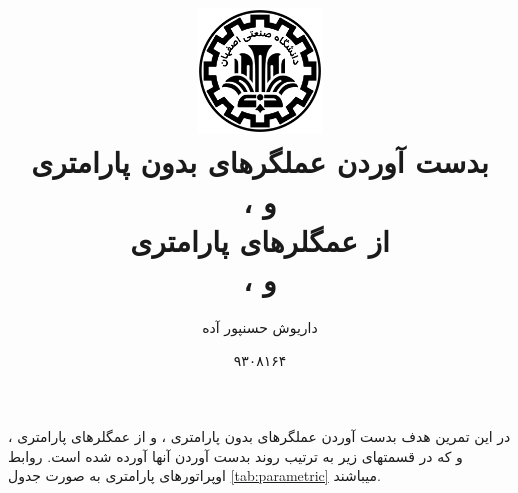 \documentclass[10pt,a4paper]{article}
\newcommand{\نیمفاصله}{\halfspace}
\renewcommand{\ }{\halfspace}
\begin{document}
\title{
    \includegraphics[width=0.25\textwidth]{iut}\\\vspace{30pt}
    بدست آوردن عملگرهای بدون پارامتری\\
     ،  و \\
    از عمگلرهای پارامتری\\
     ،  و 
}
\author{داریوش حسن\ پور آده}
\date{۹۳۰۸۱۶۴}
\maketitle
\null
\vfill
\thispagestyle{empty}
\setcounter{page}{0}
\newpage
{}
در این تمرین هدف  بدست آوردن عملگرهای بدون پارامتری
 ،  و 
از عمگلرهای پارامتری
 ،  و 
که در قسمت\ های زیر به ترتیب روند بدست آوردن آنها آورده شده است.
\tableofcontents
\newpage
{}
روابط اوپراتورهای پارامتری به صورت جدول
\ref{tab:parametric}
می\ باشند.
\end{document}
